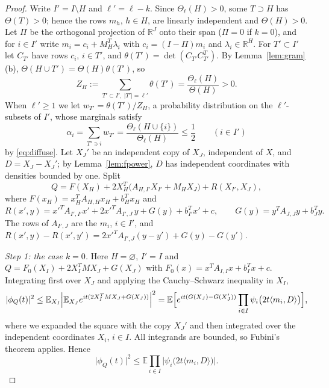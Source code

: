 \documentclass[11pt]{amsart}
\numberwithin{equation}{section}
\theoremstyle{definition}
\theoremstyle{remark}
\newcommand{\R}{\mathbb R}
\newcommand{\E}{\mathbb E}
\newcommand{\1}{\mathbf 1}
\newcommand{\abs}[1]{\lvert #1\rvert}
\begin{document}
\begin{proof}
Write $I'=I\setminus H$ and $\ell'=\ell-k$. Since $\Theta_\ell(H)>0$, some $T\supset H$ has $\Theta(T)>0$; hence the rows $m_h$, $h\in H$, are linearly independent and $\Theta(H)>0$. Let $\Pi$ be the orthogonal projection of $\R^J$ onto their span ($\Pi=0$ if $k=0$), and for $i\in I'$ write $m_i=c_i+M_H^T\lambda_i$ with $c_i=(I-\Pi)m_i$ and $\lambda_i\in\R^H$. For $T'\subset I'$ let $C_{T'}$ have rows $c_i$, $i\in T'$, and $\theta(T')=\det(C_{T'}C_{T'}^T)$. By Lemma~\ref{lem:gram}(b), $\Theta(H\cup T')=\Theta(H)\theta(T')$, so
\[
Z_H:=\sum_{T'\subset I',\ \abs{T'}=\ell'}\theta(T')=\frac{\Theta_\ell(H)}{\Theta(H)}>0 .
\]
When $\ell'\ge1$ we let $w_{T'}=\theta(T')/Z_H$, a probability distribution on the $\ell'$-subsets of $I'$, whose marginals satisfy
\[
\alpha_i=\sum_{T'\ni i}w_{T'}=\frac{\Theta_\ell(H\cup\{i\})}{\Theta_\ell(H)}\le\frac12\qquad(i\in I')
\]
by \eqref{eq:diffuse}. Let $X_J'$ be an independent copy of $X_J$, independent of $X$, and $D=X_J-X_J'$; by Lemma~\ref{lem:fpower}, $D$ has independent coordinates with densities bounded by one. Split
\[
Q=F(X_H)+2X_H^T\bigl(A_{H,I'}X_{I'}+M_HX_J\bigr)+R(X_{I'},X_J),
\]
where $F(x_H)=x_H^TA_{H,H}x_H+b_H^Tx_H$ and
\[
R(x',y)=x'^TA_{I',I'}x'+2x'^TA_{I',J}\,y+G(y)+b_{I'}^Tx'+c,\qquad G(y)=y^TA_{J,J}y+b_J^Ty .
\]
The rows of $A_{I',J}$ are the $m_i$, $i\in I'$, and $R(x',y)-R(x',y')=2x'^TA_{I',J}(y-y')+G(y)-G(y')$.

\emph{Step 1: the case $k=0$.} Here $H=\varnothing$, $I'=I$ and $Q=F_0(X_I)+2X_I^TMX_J+G(X_J)$ with $F_0(x)=x^TA_{I,I}x+b_I^Tx+c$. Integrating first over $X_J$ and applying the Cauchy--Schwarz inequality in $X_I$,
\[
\abs{\phi_Q(t)}^2\le\E_{X_I}\Bigl\lvert\E_{X_J}e^{it(2X_I^TMX_J+G(X_J))}\Bigr\rvert^2
=\E\Bigl[e^{it(G(X_J)-G(X_J'))}\prod_{i\in I}\psi_i\bigl(2t\langle m_i,D\rangle\bigr)\Bigr],
\]
where we expanded the square with the copy $X_J'$ and then integrated over the independent coordinates $X_i$, $i\in I$. All integrands are bounded, so Fubini's theorem applies. Hence
\begin{equation}\label{eq:step1}
\abs{\phi_Q(t)}^2\le\E\prod_{i\in I}\bigl\lvert\psi_i\bigl(2t\langle m_i,D\rangle\bigr)\bigr\rvert .
\end{equation}


\end{proof}
\end{document}
